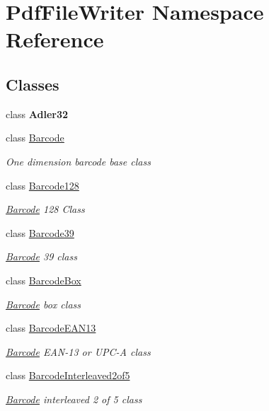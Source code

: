 \hypertarget{namespace_pdf_file_writer}{}\section{Pdf\+File\+Writer Namespace Reference}
\label{namespace_pdf_file_writer}
\subsection*{Classes}
\begin{DoxyCompactItemize}
\item 
class {\bfseries Adler32}
\item 
class \hyperlink{class_pdf_file_writer_1_1_barcode}{Barcode}
\begin{DoxyCompactList}\small\item\em One dimension barcode base class \end{DoxyCompactList}\item 
class \hyperlink{class_pdf_file_writer_1_1_barcode128}{Barcode128}
\begin{DoxyCompactList}\small\item\em \hyperlink{class_pdf_file_writer_1_1_barcode}{Barcode} 128 Class \end{DoxyCompactList}\item 
class \hyperlink{class_pdf_file_writer_1_1_barcode39}{Barcode39}
\begin{DoxyCompactList}\small\item\em \hyperlink{class_pdf_file_writer_1_1_barcode}{Barcode} 39 class \end{DoxyCompactList}\item 
class \hyperlink{class_pdf_file_writer_1_1_barcode_box}{Barcode\+Box}
\begin{DoxyCompactList}\small\item\em \hyperlink{class_pdf_file_writer_1_1_barcode}{Barcode} box class \end{DoxyCompactList}\item 
class \hyperlink{class_pdf_file_writer_1_1_barcode_e_a_n13}{Barcode\+E\+A\+N13}
\begin{DoxyCompactList}\small\item\em \hyperlink{class_pdf_file_writer_1_1_barcode}{Barcode} E\+A\+N-\/13 or U\+P\+C-\/A class \end{DoxyCompactList}\item 
class \hyperlink{class_pdf_file_writer_1_1_barcode_interleaved2of5}{Barcode\+Interleaved2of5}
\begin{DoxyCompactList}\small\item\em \hyperlink{class_pdf_file_writer_1_1_barcode}{Barcode} interleaved 2 of 5 class \end{DoxyCompactList}\item 

\end{DoxyCompactItemize}
